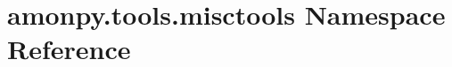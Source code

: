 \hypertarget{namespaceamonpy_1_1tools_1_1misctools}{\section{amonpy.\-tools.\-misctools Namespace Reference}
\label{namespaceamonpy_1_1tools_1_1misctools}
}
